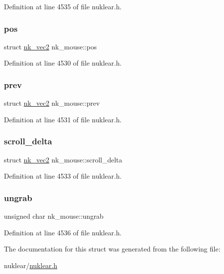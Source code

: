 Definition at line 4535 of file nuklear.\+h.

\mbox{\label{structnk__mouse_a07c094826e58d6d56af36b61ec91cc9a}} 
\subsubsection{\texorpdfstring{pos}{pos}}
{\footnotesize\ttfamily struct \mbox{\hyperlink{structnk__vec2}{nk\+\_\+vec2}} nk\+\_\+mouse\+::pos}



Definition at line 4530 of file nuklear.\+h.

\mbox{\label{structnk__mouse_ae9bfaf081795f248ee28ff73e0e7510b}} 
\subsubsection{\texorpdfstring{prev}{prev}}
{\footnotesize\ttfamily struct \mbox{\hyperlink{structnk__vec2}{nk\+\_\+vec2}} nk\+\_\+mouse\+::prev}



Definition at line 4531 of file nuklear.\+h.

\mbox{\label{structnk__mouse_a73dd665a6eca9bc85763a6148f0ff459}} 
\subsubsection{\texorpdfstring{scroll\+\_\+delta}{scroll\_delta}}
{\footnotesize\ttfamily struct \mbox{\hyperlink{structnk__vec2}{nk\+\_\+vec2}} nk\+\_\+mouse\+::scroll\+\_\+delta}



Definition at line 4533 of file nuklear.\+h.

\mbox{\label{structnk__mouse_a3420ca85bb04a09dd14694dfb394c7f0}} 
\subsubsection{\texorpdfstring{ungrab}{ungrab}}
{\footnotesize\ttfamily unsigned char nk\+\_\+mouse\+::ungrab}



Definition at line 4536 of file nuklear.\+h.



The documentation for this struct was generated from the following file\+:\begin{DoxyCompactItemize}
\item 
nuklear/\mbox{\hyperlink{nuklear_8h}{nuklear.\+h}}\end{DoxyCompactItemize}

